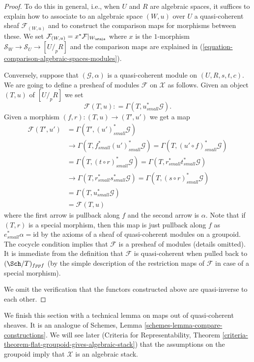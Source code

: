 \begin{proof}
\medskip\noindent
To do this in general, i.e., when $U$ and $R$ are algebraic spaces,
it suffices to explain how to associate to an algebraic space $(W, u)$ over
$U$ a quasi-coherent sheaf $\mathcal{F}_{(W, u)}$ and to construct the
comparison maps for morphisms between these. We set
$\mathcal{F}_{(W, u)} = x^*\mathcal{F}|_{W_\etale}$
where $x$ is the $1$-morphism
$\mathcal{S}_W \to \mathcal{S}_U \to [U/_{\!p}R]$ and the comparison
maps are explained in (\ref{equation-comparison-algebraic-spaces-modules}).

\medskip\noindent
Conversely, suppose that $(\mathcal{G}, \alpha)$ is a quasi-coherent
module on $(U, R, s, t, c)$. We are going to define a presheaf of modules
$\mathcal{F}$ on $\mathcal{X}$ as follows. Given an object
$(T, u)$ of $[U/_{\!p}R]$ we set
$$
\mathcal{F}(T, u) : = \Gamma(T, u_{small}^*\mathcal{G}).
$$
Given a morphism $(f, r) : (T, u) \to (T', u')$ we get a map
\begin{align*}
\mathcal{F}(T', u') & = \Gamma(T', (u')_{small}^*\mathcal{G}) \\
& \to \Gamma(T, f_{small}^*(u')_{small}^*\mathcal{G}) =
\Gamma(T, (u' \circ f)_{small}^*\mathcal{G}) \\
& = \Gamma(T, (t \circ r)_{small}^*\mathcal{G}) =
\Gamma(T, r_{small}^*t_{small}^*\mathcal{G}) \\
& \to \Gamma(T, r_{small}^*s_{small}^*\mathcal{G}) =
\Gamma(T, (s \circ r)_{small}^*\mathcal{G}) \\
& = \Gamma(T, u_{small}^*\mathcal{G}) \\
& = \mathcal{F}(T, u)
\end{align*}
where the first arrow is pullback along $f$ and the second arrow is
$\alpha$. Note that if $(T, r)$ is a special morphism, then this
map is just pullback along $f$ as $e_{small}^*\alpha = \text{id}$ by
the axioms of a sheaf of quasi-coherent modules on a groupoid.
The cocycle condition implies that $\mathcal{F}$ is a presheaf
of modules (details omitted). It is immediate from the definition that
$\mathcal{F}$ is quasi-coherent when pulled back to
$(\Sch/T)_{fppf}$ (by the simple description of the
restriction maps of $\mathcal{F}$ in case of a special morphism).

\medskip\noindent
We omit the verification that the functors constructed above are
quasi-inverse to each other.
\end{proof}

\noindent
We finish this section with a technical lemma on maps out of quasi-coherent
sheaves. It is an analogue of
Schemes, Lemma \ref{schemes-lemma-compare-constructions}.
We will see later (Criteria for Representability, Theorem
\ref{criteria-theorem-flat-groupoid-gives-algebraic-stack})
that the assumptions on the groupoid imply that $\mathcal{X}$ is
an algebraic stack.

